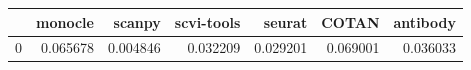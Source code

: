 \begin{tabular}{lrrrrrr}
\toprule
 & monocle & scanpy & scvi-tools & seurat & COTAN & antibody \\
\midrule
0 & 0.065678 & 0.004846 & 0.032209 & 0.029201 & 0.069001 & 0.036033 \\
\bottomrule
\end{tabular}
